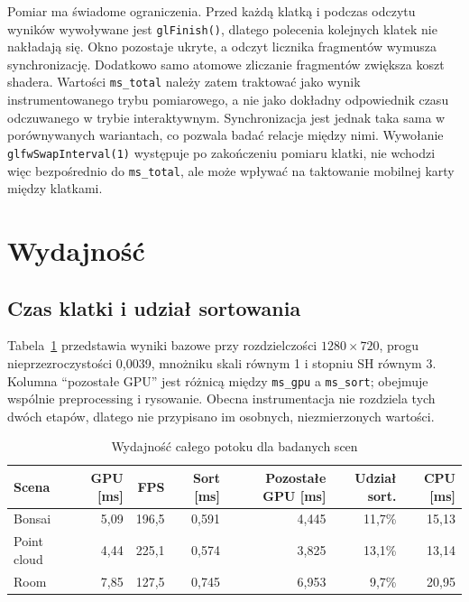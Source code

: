 Pomiar ma świadome ograniczenia. Przed każdą klatką i podczas odczytu wyników wywoływane jest \texttt{glFinish()}, dlatego polecenia kolejnych klatek nie nakładają się. Okno pozostaje ukryte, a odczyt licznika fragmentów wymusza synchronizację. Dodatkowo samo atomowe zliczanie fragmentów zwiększa koszt shadera. Wartości \texttt{ms\_total} należy zatem traktować jako wynik instrumentowanego trybu pomiarowego, a nie jako dokładny odpowiednik czasu odczuwanego w trybie interaktywnym. Synchronizacja jest jednak taka sama w porównywanych wariantach, co pozwala badać relacje między nimi. Wywołanie \texttt{glfwSwapInterval(1)} występuje po zakończeniu pomiaru klatki, nie wchodzi więc bezpośrednio do \texttt{ms\_total}, ale może wpływać na taktowanie mobilnej karty między klatkami.

\section{Wydajność}
\label{sec:wydajnosc}

\subsection{Czas klatki i udział sortowania}

Tabela~\ref{tab:wydajnosc_scen} przedstawia wyniki bazowe przy rozdzielczości $1280\times720$, progu nieprzezroczystości 0,0039, mnożniku skali równym 1 i stopniu SH równym 3. Kolumna ``pozostałe GPU'' jest różnicą między \texttt{ms\_gpu} a \texttt{ms\_sort}; obejmuje wspólnie preprocessing i rysowanie. Obecna instrumentacja nie rozdziela tych dwóch etapów, dlatego nie przypisano im osobnych, niezmierzonych wartości.

\begin{table}[htbp]
  \centering
  \caption{Wydajność całego potoku dla badanych scen}
  \label{tab:wydajnosc_scen}
  \scriptsize
  \renewcommand{\arraystretch}{1.15}
  \begin{tabular}{lrrrrrr}
    \toprule
    \textbf{Scena} & \textbf{GPU [ms]} & \textbf{FPS} & \textbf{Sort [ms]} &
    \textbf{Pozostałe GPU [ms]} & \textbf{Udział sort.} & \textbf{CPU [ms]} \\
    \midrule
    Bonsai      & 5,09 & 196,5 & 0,591 & 4,445 & 11,7\% & 15,13 \\
    Point cloud & 4,44 & 225,1 & 0,574 & 3,825 & 13,1\% & 13,14 \\
    Room        & 7,85 & 127,5 & 0,745 & 6,953 & 9,7\%  & 20,95 \\
    \bottomrule
  \end{tabular}
\end{table}

